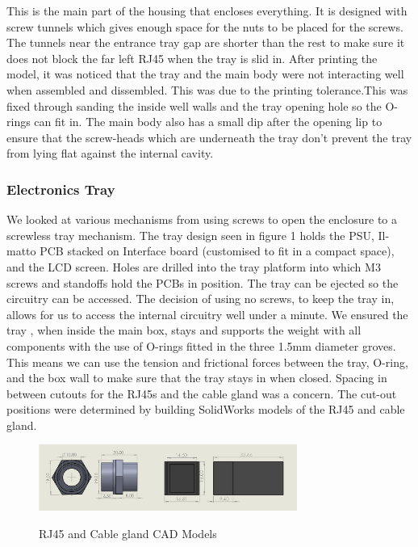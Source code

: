 \documentclass[9pt, technote, a4paper, nofonttune]{IEEEphot}
\begin{document}
        This is the main part of the housing that encloses everything. It is designed with screw tunnels which gives enough space for the nuts to be placed for the screws. The tunnels near the entrance tray gap are shorter than the rest to make sure it does not block the far left RJ45 when the tray is slid in. After printing the model, it was noticed that the tray and the main body were not interacting well when assembled and dissembled. This was due to the printing tolerance.This was fixed through sanding the inside well walls and the tray opening hole so the O-rings can fit in. The main body also has a small dip after the opening lip to ensure that the screw-heads which are underneath the tray don't prevent the tray from lying flat against the internal cavity. 
        
        \subsubsection{Electronics Tray}
        \hspace{0.5cm}We looked at various mechanisms from using screws to open the enclosure to a screwless tray mechanism. The tray design seen in figure 1 holds the PSU, Il-matto PCB stacked on Interface board (customised to fit in a compact space), and the LCD screen. Holes are drilled into the tray platform into which M3 screws and standoffs hold the PCBs in position. The tray can be ejected so the circuitry can be accessed. The decision of using no screws, to keep the tray in, allows for us to access the internal circuitry well under a minute. We ensured the tray , when inside the main box, stays and supports the weight with all components with the use of O-rings fitted in the three 1.5mm diameter groves. This means we can use the tension and frictional forces between the tray, O-ring, and the box wall to make sure that the tray stays in when closed.
        Spacing in between cutouts for the RJ45s and the cable gland was a concern. The cut-out positions were determined by building SolidWorks models of the RJ45 and cable gland. 
        \begin{figure}[h]
        \centering
        \includegraphics[width=20pc]{D5/CableGland_RJ45_CAD.png}
        \label{fig_env1}
        \caption{RJ45 and Cable gland CAD Models}
        \end{figure}
\end{document}
